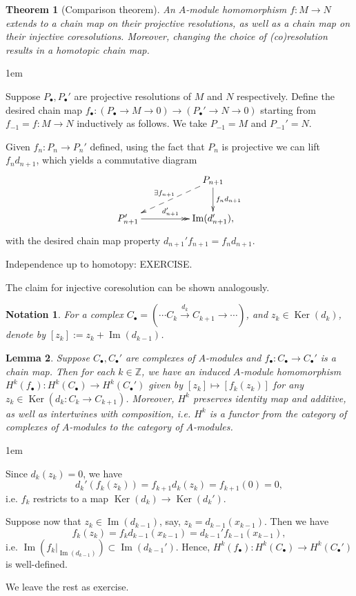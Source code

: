 \documentclass[11pt,a4paper]{article}
\makeatletter
\numberwithin{equation}{section}
\renewenvironment{proof}[1][\proofname]{\par
    \pushQED{\qed}%
    \normalfont \topsep0\p@\@plus6\p@ \labelsep1em\relax
    \trivlist
    \item[\hskip\labelsep\indent
        \bfseries #1]\ignorespaces
    \mbox{}
}{
    \popQED\endtrivlist\@endpefalse
}
\theoremstyle{all}
\newtheorem{theorem}{Theorem}[section]
\newtheorem{lemma}[theorem]{Lemma}
\newtheorem*{notation}{Notation}
\theoremstyle{remark}
\newcommand{\Z}{\mathbb{Z}}
\renewcommand{\Im}{\operatorname{Im}\nolimits}
\newcommand{\Ker}{\operatorname{Ker}\nolimits}
\makeatother
\begin{document}
\begin{theorem}[Comparison theorem]\label{comparison thm}
An $A$-module homomorphism $f:M\to N$ extends to a chain map on their projective resolutions, as well as a chain map on their injective coresolutions.
Moreover, changing the choice of (co)resolution results in a homotopic chain map.
\end{theorem}
\begin{proof}
Suppose $P_\bullet, P_\bullet'$ are projective resolutions of $M$ and $N$ respectively.
Define the desired chain map $f_\bullet: (P_\bullet\to M\to 0)\to (P_\bullet'\to N\to 0)$ starting from $f_{-1}=f:M\to N$ inductively as follows.
We take $P_{-1}=M$ and $P_{-1}'=N$.

Given $f_n:P_n\to P_n'$ defined, using the fact that $P_n$ is projective we can lift $f_nd_{n+1}$, which yields a commutative diagram
\[
\xymatrix@C=50pt{ & P_{n+1} \ar@{-->}[ld]_{\exists f_{n+1}} \ar[d]^{f_nd_{n+1}}  \\
P_{n+1}' \ar@{->>}[r]^{d_{n+1}'} & \Im(d_{n+1}'),
}
\]
with the desired chain map property $d_{n+1}'f_{n+1}=f_nd_{n+1}$.

Independence up to homotopy:  EXERCISE.

The claim for injective coresolution can be shown analogously.
\end{proof}

\begin{notation}
For a complex $C_\bullet=(\cdots C_k\xrightarrow{d_k} C_{k+1}\to\cdots)$, and $z_k\in \Ker(d_k)$, denote by $[z_k]:=z_k+\Im(d_{k-1})$.
\end{notation}


\begin{lemma}\label{lem:homology functor}
Suppose $C_\bullet, C_\bullet'$ are complexes of $A$-modules and $f_\bullet:C_\bullet\to C_\bullet'$ is a chain map.
Then for each $k\in \Z$, we have an induced $A$-module homomorphism $H^k(f_\bullet):H^k(C_\bullet)\to H^k(C_\bullet')$ given by $[z_k]\mapsto [f_k(z_k)]$ for any $z_k\in \Ker(d_k:C_k\to C_{k+1})$.
Moreover, $H^k$ preserves identity map and additive, as well as intertwines with composition, i.e. $H^k$ is a functor from the category of complexes of $A$-modules to the category of $A$-modules.
\end{lemma}
\begin{proof}
Since $d_k(z_k)=0$, we have 
\[
d_k'(f_k(z_k)) = f_{k+1}d_k(z_k)=f_{k+1}(0)=0,
\]
i.e. $f_k$ restricts to a map $\Ker(d_k)\to \Ker(d_k')$.

Suppose now that $z_k\in \Im(d_{k-1})$, say, $z_k=d_{k-1}(x_{k-1})$.
Then we have \[
f_k(z_k)=f_kd_{k-1}(x_{k-1})=d_{k-1}'f_{k-1}(x_{k-1}),
\]
i.e. $\Im(f_k|_{\Im(d_{k-1})}) \subset \Im(d_{k-1}')$.
Hence, $H^k(f_\bullet):H^k(C_\bullet)\to H^k(C_\bullet')$ is well-defined.

We leave the rest as exercise.
\end{proof}
\end{document}
